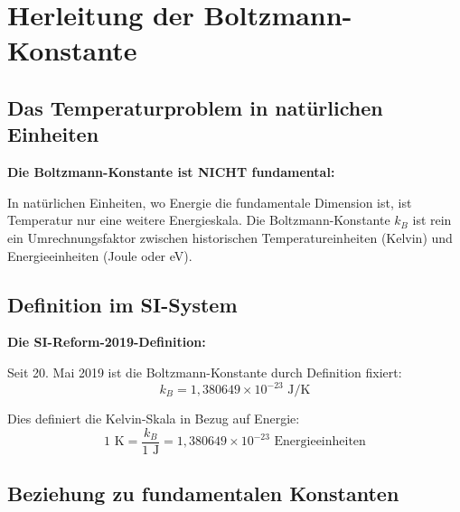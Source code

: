 \documentclass[12pt,a4paper]{article}
\begin{document}
\section{Herleitung der Boltzmann-Konstante}

\subsection{Das Temperaturproblem in nat{\"u}rlichen Einheiten}

\begin{warning}
\textbf{Die Boltzmann-Konstante ist NICHT fundamental:}

In nat{\"u}rlichen Einheiten, wo Energie die fundamentale Dimension ist, ist Temperatur nur eine weitere Energieskala. Die Boltzmann-Konstante $k_B$ ist rein ein Umrechnungsfaktor zwischen historischen Temperatureinheiten (Kelvin) und Energieeinheiten (Joule oder eV).
\end{warning}

\subsection{Definition im SI-System}

\begin{derivation}
\textbf{Die SI-Reform-2019-Definition:}

Seit 20. Mai 2019 ist die Boltzmann-Konstante durch Definition fixiert:
\begin{equation}
\boxed{k_B = 1{,}380649 \times 10^{-23} \text{ J/K}}
\label{eq:kb_si}
\end{equation}

Dies definiert die Kelvin-Skala in Bezug auf Energie:
\begin{equation}
1 \text{ K} = \frac{k_B}{1 \text{ J}} = 1{,}380649 \times 10^{-23} \text{ Energieeinheiten}
\end{equation}
\end{derivation}

\subsection{Beziehung zu fundamentalen Konstanten}
\end{document}
